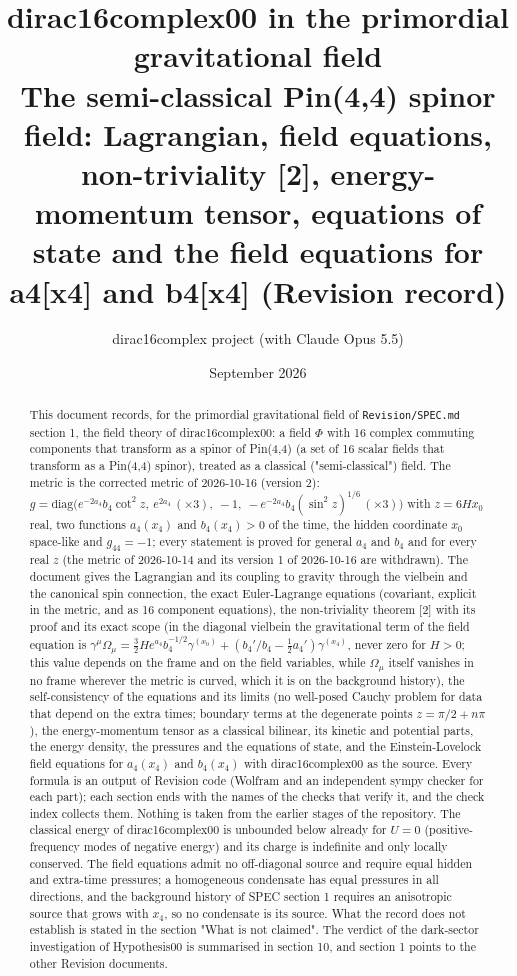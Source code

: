 \documentclass[11pt]{article}
\title{dirac16complex00 in the primordial gravitational field\\[0.5em]\large The semi-classical Pin(4,4) spinor field: Lagrangian, field equations, non-triviality [2], energy-momentum tensor, equations of state and the field equations for a4[x4] and b4[x4] (Revision record)}
\author{dirac16complex project (with Claude Opus 5.5)}
\date{September 2026}
\begin{document}
\maketitle
\tableofcontents
\newpage
\begin{abstract}
This document records, for the primordial gravitational field of \texttt{Revision\allowbreak{}/SPEC.md} section 1, the field theory of dirac16complex00: a field $\Phi$ with 16 complex commuting components that transform as a spinor of Pin(4,4) (a set of 16 scalar fields that transform as a Pin(4,4) spinor), treated as a classical ("semi-classical") field. The metric is the corrected metric of 2026-10-16 (version 2): $g = \mathrm{diag}\big(e^{-2a_4}b_4\cot^2 z,\ e^{2a_4}\,(\times3),\ -1,\ -e^{-2a_4}b_4(\sin^2 z)^{1/6}\,(\times3)\big)$ with $z = 6Hx_0$ real, two functions $a_4(x_4)$ and $b_4(x_4) > 0$ of the time, the hidden coordinate $x_0$ space-like and $g_{44} = -1$; every statement is proved for general $a_4$ and $b_4$ and for every real $z$ (the metric of 2026-10-14 and its version 1 of 2026-10-16 are withdrawn). The document gives the Lagrangian and its coupling to gravity through the vielbein and the canonical spin connection, the exact Euler-Lagrange equations (covariant, explicit in the metric, and as 16 component equations), the non-triviality theorem [2] with its proof and its exact scope (in the diagonal vielbein the gravitational term of the field equation is $\gamma^\mu\Omega_\mu = \tfrac32He^{a_4}b_4^{-1/2}\gamma^{(x_0)} + (b_4'/b_4 - \tfrac12a_4')\gamma^{(x_4)}$, never zero for $H > 0$; this value depends on the frame and on the field variables, while $\Omega_\mu$ itself vanishes in no frame wherever the metric is curved, which it is on the background history), the self-consistency of the equations and its limits (no well-posed Cauchy problem for data that depend on the extra times; boundary terms at the degenerate points $z = \pi/2 + n\pi$), the energy-momentum tensor as a classical bilinear, its kinetic and potential parts, the energy density, the pressures and the equations of state, and the Einstein-Lovelock field equations for $a_4(x_4)$ and $b_4(x_4)$ with dirac16complex00 as the source. Every formula is an output of Revision code (Wolfram and an independent sympy checker for each part); each section ends with the names of the checks that verify it, and the check index collects them. Nothing is taken from the earlier stages of the repository. The classical energy of dirac16complex00 is unbounded below already for $U = 0$ (positive-frequency modes of negative energy) and its charge is indefinite and only locally conserved. The field equations admit no off-diagonal source and require equal hidden and extra-time pressures; a homogeneous condensate has equal pressures in all directions, and the background history of SPEC section 1 requires an anisotropic source that grows with $x_4$, so no condensate is its source. What the record does not establish is stated in the section "What is not claimed". The verdict of the dark-sector investigation of Hypothesis00 is summarised in section 10, and section 1 points to the other Revision documents.

\end{abstract}
\end{document}
